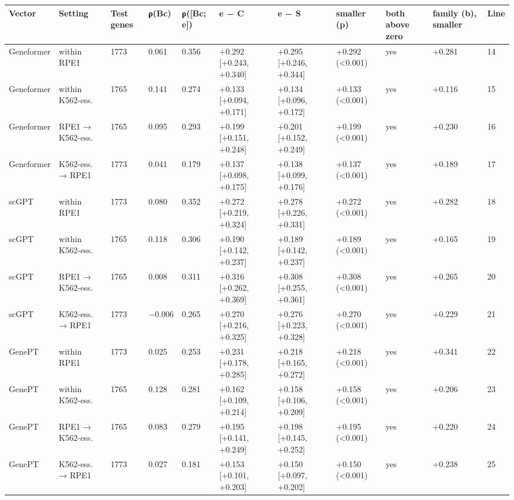 \begin{tabular}{lllllllllll}
\toprule
Vector & Setting & Test genes & ρ(Bc) & ρ([Bc; e]) & e − C & e − S & smaller (p) & both above zero & family (b), smaller & Line \\
\midrule
Geneformer & within RPE1 & 1773 & 0.061 & 0.356 & +0.292 [+0.243, +0.340] & +0.295 [+0.246, +0.344] & +0.292 (<0.001) & yes & +0.281 & 14 \\
Geneformer & within K562-ess. & 1765 & 0.141 & 0.274 & +0.133 [+0.094, +0.171] & +0.134 [+0.096, +0.172] & +0.133 (<0.001) & yes & +0.116 & 15 \\
Geneformer & RPE1 → K562-ess. & 1765 & 0.095 & 0.293 & +0.199 [+0.151, +0.248] & +0.201 [+0.152, +0.249] & +0.199 (<0.001) & yes & +0.230 & 16 \\
Geneformer & K562-ess. → RPE1 & 1773 & 0.041 & 0.179 & +0.137 [+0.098, +0.175] & +0.138 [+0.099, +0.176] & +0.137 (<0.001) & yes & +0.189 & 17 \\
scGPT & within RPE1 & 1773 & 0.080 & 0.352 & +0.272 [+0.219, +0.324] & +0.278 [+0.226, +0.331] & +0.272 (<0.001) & yes & +0.282 & 18 \\
scGPT & within K562-ess. & 1765 & 0.118 & 0.306 & +0.190 [+0.142, +0.237] & +0.189 [+0.142, +0.237] & +0.189 (<0.001) & yes & +0.165 & 19 \\
scGPT & RPE1 → K562-ess. & 1765 & 0.008 & 0.311 & +0.316 [+0.262, +0.369] & +0.308 [+0.255, +0.361] & +0.308 (<0.001) & yes & +0.265 & 20 \\
scGPT & K562-ess. → RPE1 & 1773 & −0.006 & 0.265 & +0.270 [+0.216, +0.325] & +0.276 [+0.223, +0.328] & +0.270 (<0.001) & yes & +0.229 & 21 \\
GenePT & within RPE1 & 1773 & 0.025 & 0.253 & +0.231 [+0.178, +0.285] & +0.218 [+0.165, +0.272] & +0.218 (<0.001) & yes & +0.341 & 22 \\
GenePT & within K562-ess. & 1765 & 0.128 & 0.281 & +0.162 [+0.109, +0.214] & +0.158 [+0.106, +0.209] & +0.158 (<0.001) & yes & +0.206 & 23 \\
GenePT & RPE1 → K562-ess. & 1765 & 0.083 & 0.279 & +0.195 [+0.141, +0.249] & +0.198 [+0.145, +0.252] & +0.195 (<0.001) & yes & +0.220 & 24 \\
GenePT & K562-ess. → RPE1 & 1773 & 0.027 & 0.181 & +0.153 [+0.101, +0.203] & +0.150 [+0.097, +0.202] & +0.150 (<0.001) & yes & +0.238 & 25 \\
\bottomrule
\end{tabular}
